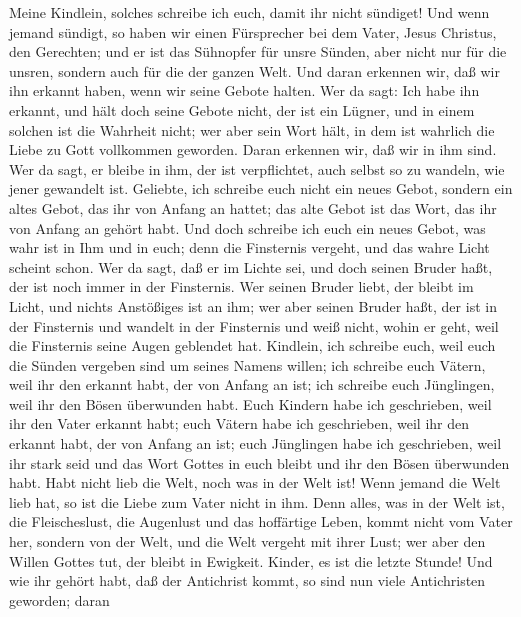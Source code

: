  Meine Kindlein, solches schreibe ich euch, damit ihr
nicht sündiget! Und wenn jemand sündigt, so haben wir einen Fürsprecher
bei dem Vater, Jesus Christus, den Gerechten;  und er ist
das Sühnopfer für unsre Sünden, aber nicht nur für die unsren, sondern
auch für die der ganzen Welt.  Und daran erkennen wir, daß
wir ihn erkannt haben, wenn wir seine Gebote halten.  Wer
da sagt: Ich habe ihn erkannt, und hält doch seine Gebote nicht, der ist
ein Lügner, und in einem solchen ist die Wahrheit nicht; 
wer aber sein Wort hält, in dem ist wahrlich die Liebe zu Gott
vollkommen geworden. Daran erkennen wir, daß wir in ihm sind.
 Wer da sagt, er bleibe in ihm, der ist verpflichtet, auch
selbst so zu wandeln, wie jener gewandelt ist.  Geliebte,
ich schreibe euch nicht ein neues Gebot, sondern ein altes Gebot, das
ihr von Anfang an hattet; das alte Gebot ist das Wort, das ihr von
Anfang an gehört habt.  Und doch schreibe ich euch ein
neues Gebot, was wahr ist in Ihm und in euch; denn die Finsternis
vergeht, und das wahre Licht scheint schon.  Wer da sagt,
daß er im Lichte sei, und doch seinen Bruder haßt, der ist noch immer in
der Finsternis.  Wer seinen Bruder liebt, der bleibt im
Licht, und nichts Anstößiges ist an ihm;  wer aber seinen
Bruder haßt, der ist in der Finsternis und wandelt in der Finsternis und
weiß nicht, wohin er geht, weil die Finsternis seine Augen geblendet
hat.  Kindlein, ich schreibe euch, weil euch die Sünden
vergeben sind um seines Namens willen;  ich schreibe euch
Vätern, weil ihr den erkannt habt, der von Anfang an ist; ich schreibe
euch Jünglingen, weil ihr den Bösen überwunden habt. 
Euch Kindern habe ich geschrieben, weil ihr den Vater erkannt habt; euch
Vätern habe ich geschrieben, weil ihr den erkannt habt, der von Anfang
an ist; euch Jünglingen habe ich geschrieben, weil ihr stark seid und
das Wort Gottes in euch bleibt und ihr den Bösen überwunden habt.
 Habt nicht lieb die Welt, noch was in der Welt ist! Wenn
jemand die Welt lieb hat, so ist die Liebe zum Vater nicht in ihm.
 Denn alles, was in der Welt ist, die Fleischeslust, die
Augenlust und das hoffärtige Leben, kommt nicht vom Vater her, sondern
von der Welt,  und die Welt vergeht mit ihrer Lust; wer
aber den Willen Gottes tut, der bleibt in Ewigkeit. 
Kinder, es ist die letzte Stunde! Und wie ihr gehört habt, daß der
Antichrist kommt, so sind nun viele Antichristen geworden; daran
